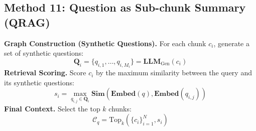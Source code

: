 \documentclass{article}
\theoremstyle{plain}
\theoremstyle{definition}
\theoremstyle{remark}
\begin{document}
\subsection{Method 11: Question as Sub-chunk Summary (QRAG)}
\label{appendix:qrag}
\textbf{Graph Construction (Synthetic Questions).} For each chunk $c_i$, generate a set of synthetic questions:
\begin{equation}
\mathbf{Q}_i = \{q_{i, 1}, \dots, q_{i, M_i}\} = \mathbf{LLM}_{\text{Gen}}(c_i)
\end{equation}
\textbf{Retrieval Scoring.} Score $c_i$ by the maximum similarity between the query and its synthetic questions:
\begin{equation}
s_i = \max_{q_{i, j} \in \mathbf{Q}_i} \mathbf{Sim}(\mathbf{Embed}(q), \mathbf{Embed}(q_{i, j}))
\end{equation}
\textbf{Final Context.} Select the top $k$ chunks:
\begin{equation}
\mathcal{C}_q = \text{Top}_k(\{c_i\}_{i=1}^N, s_i)
\end{equation}
\end{document}
